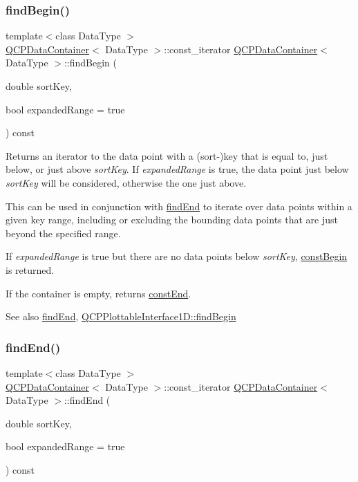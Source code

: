 \subsubsection{\texorpdfstring{find\+Begin()}{findBegin()}}
{\footnotesize\ttfamily template$<$class Data\+Type $>$ \\
\hyperlink{class_q_c_p_data_container}{Q\+C\+P\+Data\+Container}$<$ Data\+Type $>$\+::const\+\_\+iterator \hyperlink{class_q_c_p_data_container}{Q\+C\+P\+Data\+Container}$<$ Data\+Type $>$\+::find\+Begin (\begin{DoxyParamCaption}\item[{double}]{sort\+Key,  }\item[{bool}]{expanded\+Range = {\ttfamily true} }\end{DoxyParamCaption}) const}

Returns an iterator to the data point with a (sort-\/)key that is equal to, just below, or just above {\itshape sort\+Key}. If {\itshape expanded\+Range} is true, the data point just below {\itshape sort\+Key} will be considered, otherwise the one just above.

This can be used in conjunction with \hyperlink{class_q_c_p_data_container_afb8b8f23cc2b7234a793a25ce79fe48f}{find\+End} to iterate over data points within a given key range, including or excluding the bounding data points that are just beyond the specified range.

If {\itshape expanded\+Range} is true but there are no data points below {\itshape sort\+Key}, \hyperlink{class_q_c_p_data_container_a49d7622999e2de67fa2331626a3159aa}{const\+Begin} is returned.

If the container is empty, returns \hyperlink{class_q_c_p_data_container_aa7f7cf239b85b1a28de3d675cc5b3da1}{const\+End}.

\begin{DoxySeeAlso}{See also}
\hyperlink{class_q_c_p_data_container_afb8b8f23cc2b7234a793a25ce79fe48f}{find\+End}, \hyperlink{class_q_c_p_plottable_interface1_d_a5b95783271306a4de97be54eac1e7d13}{Q\+C\+P\+Plottable\+Interface1\+D\+::find\+Begin} 
\end{DoxySeeAlso}
\mbox{\label{class_q_c_p_data_container_afb8b8f23cc2b7234a793a25ce79fe48f}} 
\subsubsection{\texorpdfstring{find\+End()}{findEnd()}}
{\footnotesize\ttfamily template$<$class Data\+Type $>$ \\
\hyperlink{class_q_c_p_data_container}{Q\+C\+P\+Data\+Container}$<$ Data\+Type $>$\+::const\+\_\+iterator \hyperlink{class_q_c_p_data_container}{Q\+C\+P\+Data\+Container}$<$ Data\+Type $>$\+::find\+End (\begin{DoxyParamCaption}\item[{double}]{sort\+Key,  }\item[{bool}]{expanded\+Range = {\ttfamily true} }\end{DoxyParamCaption}) const}

